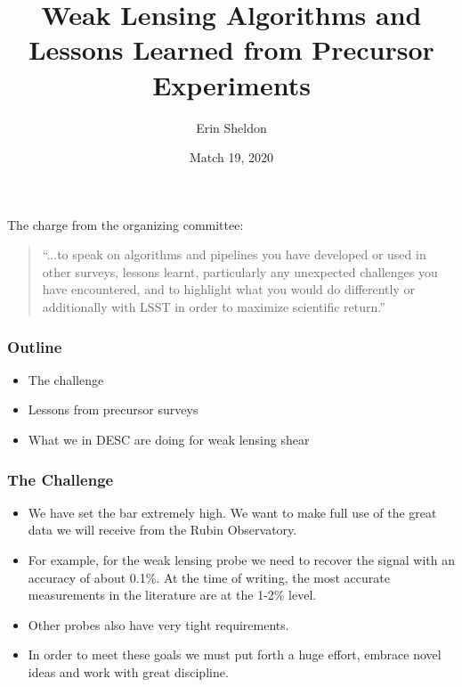 \documentclass{beamer}
\title{Weak Lensing Algorithms and Lessons Learned from Precursor Experiments}
\author{Erin Sheldon}
\institute{Brookhaven National Laboratory}
\date{Match 19, 2020}
\begin{document}


\frame{\titlepage}

%
\frame
{


    {\huge The charge from the organizing committee: }
    \newline

    \begin{quote}
    ``...to speak on algorithms and pipelines you have developed or
    used in other surveys, lessons learnt, particularly any unexpected
    challenges you have encountered, and to highlight what you would do
    differently or additionally with LSST in order to maximize scientific
    return.''
    \end{quote}


}

\frame
{

    \frametitle{Outline}


    \begin{itemize}

        \item The challenge
        \item Lessons from precursor surveys
        \item What we in DESC are doing for weak lensing shear

    \end{itemize}

}

\frame
{
    \frametitle{The Challenge}


    \begin{itemize}

        \item We have set the bar extremely high.  We want to make full use of the
            great data we will receive from the Rubin Observatory.

        \item For example, for the weak lensing probe we need to recover the
            signal with an accuracy of about 0.1\%.  At the time of writing,
            the most accurate measurements in the literature are at the 1-2\%
            level.

        \item Other probes also have very tight requirements.

        \item In order to meet these goals we must put forth a huge effort,
            embrace novel ideas and work with great discipline.

    \end{itemize}

}
\end{document}
